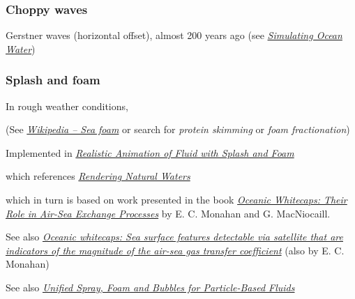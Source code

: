 \subsubsection{Choppy waves}



Gerstner waves (horizontal offset), almost 200 years ago (see \textit{\href{http://graphics.ucsd.edu/courses/rendering/2005/jdewall/tessendorf.pdf}{Simulating Ocean Water}})

\subsubsection{Splash and foam}

In rough weather conditions, 

(See \textit{\href{http://en.wikipedia.org/wiki/Sea_foam}{Wikipedia -- Sea foam}} or search for \textit{protein skimming} or \textit{foam fractionation})

Implemented in \textit{\href{http://nguyendangbinh.org/Proceedings/Eurographics/2003/cgf/volume22/issue3/paper127/paper127.pdf}{Realistic Animation of Fluid with Splash and Foam}}

which references \textit{\href{http://citeseerx.ist.psu.edu/viewdoc/download?doi=10.1.1.4.6262&rep=rep1&type=pdf}{Rendering Natural Waters}}

which in turn is based on work presented in the book \textit{\href{http://books.google.se/books?id=xuwFz1bPTHgC}{Oceanic Whitecaps: Their Role in Air-Sea Exchange Processes}} by E. C. Monahan and G. MacNiocaill.

See also \textit{\href{http://www.ias.ac.in/jess/sep2002/Ps18.pdf}{Oceanic whitecaps: Sea surface features detectable via satellite that are indicators of the magnitude of the air-sea gas transfer coefficient}} (also by  E. C. Monahan)

See also \textit{\href{http://cg.informatik.uni-freiburg.de/publications/2012_CGI_sprayFoamBubbles.pdf}{Unified Spray, Foam and Bubbles for Particle-Based Fluids}}


